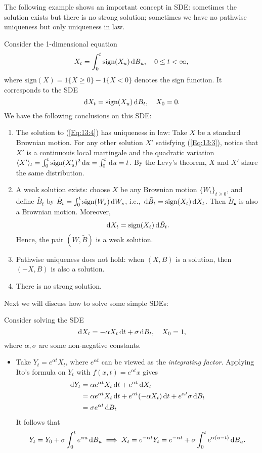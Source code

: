 The following example shows an important concept in SDE: sometimes the solution exists but there is no strong solution; sometimes we have no pathwise uniqueness but only uniqueness in law.

\begin{example}
Consider the 1-dimensional equation
\begin{equation}\label{Eq:13:3}
X_t = \int_0^t\text{sign}(X_u)\diff B_u,\quad 0\le t<\infty,
\end{equation}
where $\text{sign}(X)=1\{X\ge0\} - 1\{X<0\}$ denotes the sign function.
It corresponds to the SDE
\begin{equation}\label{Eq:13:4}
\diff X_t= \text{sign}(X_u)\diff B_t,\quad X_0=0.
\end{equation}
We have the following conclusions on this SDE:
\begin{enumerate}
\item
The solution to (\ref{Eq:13:4}) has uniqueness in law:
Take $X$ be a standard Brownian motion. For any other solution $X'$ satisfying (\eqref{Eq:13:3}), notice that $X'$ is a continuouis local martingale and the quadratic variation $\langle X'\rangle_t=\int_0^t\text{sign}(X'_u)^2\,\mathrm{d} u =\int_0^t\,\mathrm{d} u=t$.
By the Levy's theorem, $X$ and $X'$ share the same distribution.
\item
A weak solution exists: 
choose $X$ be any Brownian motion $\{W_t\}_{t\ge0}$, and define $\tilde{B_t}$ by $\tilde{B}_t=\int_0^t\text{sign}(W_s)\,\mathrm{d} W_s$, i.e., $\,\mathrm{d}\tilde{B}_t=\text{sign}(X_t)\,\mathrm{d} X_t$.
Then $\tilde{B}_{\bullet}$ is also a Brownian motion. Moreover, 
\[
\,\mathrm{d} X_t = \text{sign}(X_t)\,\mathrm{d}\tilde{B}_t.
\]
Hence, the pair $(W,\tilde{B})$ is a weak solution.
\item
Pathwise uniqueness does not hold:
when $(X,B)$ is a solution, then $(-X,B)$ is also a solution.
\item
There is no strong solution. %
\end{enumerate}
\end{example}

Next we will discuss how to solve some simple SDEs:
\begin{example}
Consider solving the SDE
\[
\,\mathrm{d} X_t=-\alpha X_t\,\mathrm{d} t + \sigma\,\mathrm{d} B_t,\quad X_0=1,
\]
where $\alpha,\sigma$ are some non-negative constants.
\begin{itemize}
\item
Take $Y_t=e^{\alpha t}X_t$, where $e^{\alpha t}$ can be viewed as the \emph{integrating factor}.
Applying Ito's formula on $Y_t$ with $f(x,t)=e^{\alpha t}x$ gives
\begin{align*}
\,\mathrm{d} Y_t&=\alpha e^{\alpha t}X_t\,\mathrm{d} t + e^{\alpha t}\,\mathrm{d} X_t\\
&=\alpha e^{\alpha t}X_t\,\mathrm{d} t + e^{\alpha t}(-\alpha X_t)\,\mathrm{d} t + e^{\alpha t}\sigma\,\mathrm{d} B_t\\
&=\sigma e^{\alpha t}\,\mathrm{d} B_t
\end{align*}
It follows that
\[
Y_t = Y_0 + \sigma\int_0^te^{\alpha u}\,\mathrm{d} B_u\implies
X_t=e^{-\alpha t}Y_t=e^{-\alpha t}+\sigma\int_0^te^{\alpha(u-t)}\,\mathrm{d} B_u.
\]
\end{itemize}
\end{example}

